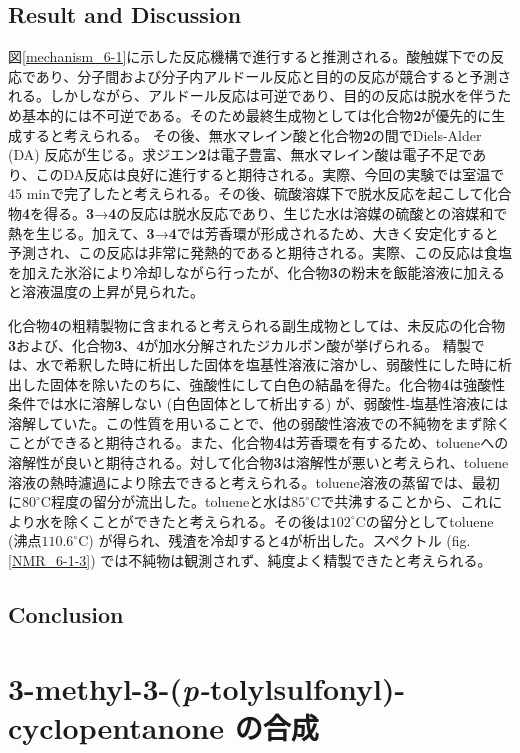 \documentclass{ltjsarticle}
\theoremstyle{definition}
\numberwithin{equation}{section}
\newcommand{\D}{^\circ\text{C}}
\begin{document}
\subsection{Result and Discussion}


図\ref{mechanism_6-1}に示した反応機構で進行すると推測される。酸触媒下での反応であり、分子間および分子内アルドール反応と目的の反応が競合すると予測される。しかしながら、アルドール反応は可逆であり、目的の反応は脱水を伴うため基本的には不可逆である。そのため最終生成物としては化合物\textbf{2}が優先的に生成すると考えられる。
その後、無水マレイン酸と化合物\textbf{2}の間でDiels-Alder (DA) 反応が生じる。求ジエン\textbf{2}は電子豊富、無水マレイン酸は電子不足であり、このDA反応は良好に進行すると期待される。実際、今回の実験では室温で45 minで完了したと考えられる。その後、硫酸溶媒下で脱水反応を起こして化合物\textbf{4}を得る。\textbf{3}→\textbf{4}の反応は脱水反応であり、生じた水は溶媒の硫酸との溶媒和で熱を生じる。加えて、\textbf{3}→\textbf{4}では芳香環が形成されるため、大きく安定化すると予測され、この反応は非常に発熱的であると期待される。実際、この反応は食塩を加えた氷浴により冷却しながら行ったが、化合物\textbf{3}の粉末を飯能溶液に加えると溶液温度の上昇が見られた。

化合物\textbf{4}の粗精製物に含まれると考えられる副生成物としては、未反応の化合物\textbf{3}および、化合物\textbf{3}、\textbf{4}が加水分解されたジカルボン酸が挙げられる。
精製では、水で希釈した時に析出した固体を塩基性溶液に溶かし、弱酸性にした時に析出した固体を除いたのちに、強酸性にして白色の結晶を得た。化合物\textbf{4}は強酸性条件では水に溶解しない (白色固体として析出する) が、弱酸性-塩基性溶液には溶解していた。この性質を用いることで、他の弱酸性溶液での不純物をまず除くことができると期待される。また、化合物\textbf{4}は芳香環を有するため、tolueneへの溶解性が良いと期待される。対して化合物\textbf{3}は溶解性が悪いと考えられ、toluene溶液の熱時濾過により除去できると考えられる。toluene溶液の蒸留では、最初に$80\D$程度の留分が流出した。tolueneと水は$85\D$で共沸する\cite{solvent_bp}ことから、これにより水を除くことができたと考えられる。その後は$102\D$の留分としてtoluene (沸点$110.6\D$) が得られ、残渣を冷却すると\textbf{4}が析出した。スペクトル (fig.\ref{NMR_6-1-3}) では不純物は観測されず、純度よく精製できたと考えられる。
\subsection{Conclusion}

\section{3-methyl-3-(\textit{p-}tolylsulfonyl)-cyclopentanone の合成}
\end{document}
